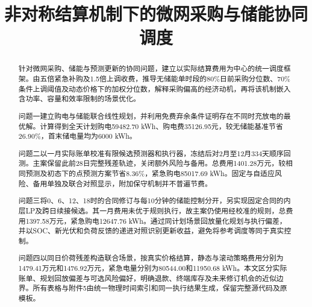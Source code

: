 \documentclass[withoutpreface,bwprint]{cumcmthesis}
\title{非对称结算机制下的微网采购与储能协同调度}
\begin{document}
\maketitle
\begin{abstract}
针对微网采购、储能与预测更新的协同问题，建立以实际结算费用为中心的统一调度框架。由五倍紧急补购及1.5倍上调收费，推导无储能单时段的80\%日前采购分位数、70\%条件上调阈值及动态价格下的加权分位数，解释采购偏高的经济动机，再将该机制嵌入含功率、容量和效率限制的场景优化。

问题一建立购电与储能联合线性规划，并利用免费弃余条件证明存在不同时充放电的最优解。计算得到全天计划购电59482.70 kWh、购电费35126.95元，较无储能基准节省26.90\%，首末储电量均为6000 kWh。

问题二以一月实际账单校准有限候选预测器和执行器，冻结后对2月至12月334天顺序回测。主案保留此前28日完整残差轨迹，关闭额外风险与备用。总费用1401.28万元，较相同预测及初态下的点预测方案节省8.36\%，紧急购电85017.69 kWh。固定与自适应风险、备用单独及联合对照显示，附加保守机制并不普遍节费。

问题三将0、6、12、18时的合同修订与每10分钟的储能控制分开，另实现固定合同的内层LP及跨日续接候选。其一月费用未优于规则执行，故主案仍使用经校准的规则，总费用1397.58万元，紧急购电12647.76 kWh。通过同计划场景回放量化规划与执行偏差，并以SOC、新光伏和负荷反馈的递进对照识别更新收益，避免将参考调度等同于真实控制。

问题四以同日价荷残差构造联合场景，按真实价格结算，静态与滚动策略费用分别为1479.41万元和1476.92万元，紧急电量分别为80544.00和11950.68 kWh。本文区分实际账单、规划回放偏差与可选风险偏好，明确退款、终端库存及未来修订机会的近似边界。所有表格与附件5由统一物理时间索引和同一执行结果生成，保留完整源代码及原模板。

\end{abstract}


\FloatBarrier

\FloatBarrier

\FloatBarrier

\FloatBarrier

\FloatBarrier


\FloatBarrier
{}


\clearpage
\begin{appendices}

\end{appendices}
\end{document}
